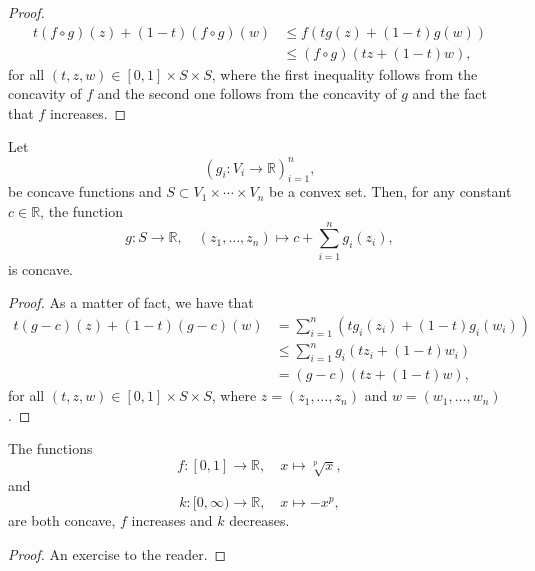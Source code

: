 \begin{proof}
  \begin{align*}
    t(f\circ{g})(z)+(1-t)(f\circ{g})(w)
    &\leqslant{f(tg(z)+(1-t)g(w))}\\
    &\leqslant{(f\circ{g})(tz+(1-t)w)},
  \end{align*}
  for all \((t,z,w)\in{[0,1]\times{S}\times{S}}\), where the first inequality
  follows from the concavity of \(f\) and the second one follows from the
  concavity of \(g\) and the fact that \(f\) increases.
\end{proof}

\begin{lemma}\label{lemma:concavity-of-sums-of-concave-functions}
  Let
  \[
    \left(g_{i}:V_{i}\to\mathbb{R}\right)_{i=1}^{n},
  \]
  be concave functions and \(S\subset{V_{1}\times\cdots\times{V_{n}}}\) be a
  convex set. Then, for any constant \(c\in\mathbb{R}\), the function
  \[
    g:S\to\mathbb{R},\quad{(z_{1},\ldots,z_{n})\mapsto{c+\sum_{i=1}^{n}g_{i}(z_{i})}},
  \]
  is concave.
\end{lemma}

\begin{proof}
  As a matter of fact, we have that
  \begin{align*}
    t(g-c)(z)+(1-t)(g-c)(w)
    &=
    \sum_{i=1}^{n}\left(tg_{i}(z_{i})+(1-t)g_{i}(w_{i})\right)
    \\
    &\leqslant
    \sum_{i=1}^{n}g_{i}\left(tz_{i}+(1-t)w_{i}\right)
    \\
    &=
    (g-c)\left(tz+(1-t)w\right),
  \end{align*}
  for all \((t,z,w)\in{[0,1]\times{S}\times{S}}\), where
  \(z=(z_{1},\ldots,z_{n})\) and \(w=(w_{1},\ldots,w_{n})\).
\end{proof}

\begin{lemma}\label{lemma:two-concave-functions}
  The functions
  \begin{equation}\label{eq:f-function}
    f:[0,1]\to\mathbb{R},\quad{x\mapsto{\sqrt[p]{x}}},
  \end{equation}
  and
  \begin{equation}\label{eq:k-function}
    k:[0,\infty)\to\mathbb{R},\quad{x\mapsto{-x^{p}}},
  \end{equation}
  are both concave, \(f\) increases and \(k\) decreases.
\end{lemma}

\begin{proof}
  An exercise to the reader.
\end{proof}

